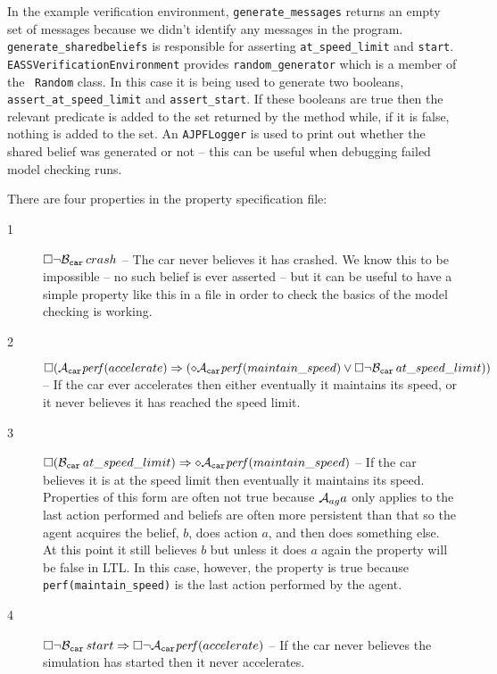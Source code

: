 \documentclass[a4]{article}
\begin{document}
In the example verification environment, \texttt{generate\_messages} returns an empty set of messages because we didn't identify any messages in the program.  \texttt{generate\_sharedbeliefs} is responsible for asserting \lstinline{at_speed_limit} and \lstinline{start}.  \texttt{EASSVerificationEnvironment} provides \texttt{random\_generator} which is a member of the \java\ \texttt{Random} class.  In this case it is being used to generate two booleans, \texttt{assert\_at\_speed\_limit} and \texttt{assert\_start}.  If these booleans are true then the relevant predicate is added to the set returned by the method while, if it is false, nothing is added to the set.  An \texttt{AJPFLogger} is used to print out whether the shared belief was generated or not -- this can be useful when debugging failed model checking runs.

There are four properties in the property specification file:
\begin{description}
\item[1] $\Box \neg \mathrm{{\cal B}}_{\texttt{car}} \, crash$ -- The car never believes it has crashed.  We know this to be impossible -- no such belief is ever asserted -- but it can be useful to have a simple property like this in a file in order to check the basics of the model checking is working.
\item[2] $\Box ( \mathrm{{\cal A}}_{\texttt{car}} \mathit{perf}(accelerate) \Rightarrow (\diamond \mathrm{{\cal A}}_{\texttt{car}} \mathit{perf}(maintain\_speed) \lor \Box  \neg \mathrm{{\cal B}}_{\texttt{car}} \, at\_speed\_limit))$ -- If the car ever accelerates then either eventually it maintains its speed, or it never believes it has reached the speed limit.
\item[3] $\Box ( \mathrm{{\cal B}}_{\texttt{car}} \, at\_speed\_limit) \Rightarrow \diamond \mathrm{{\cal A}}_{\texttt{car}} \mathit{perf}(maintain\_speed)$ -- If the car believes it is at the speed limit then eventually it maintains its speed.  Properties of this form are often not true because $\mathrm{{\cal A}}_{ag} a$ only applies to the last action performed and beliefs are often more persistent than that so the agent acquires the belief, $b$, does action $a$, and then does something else.  At this point it still believes $b$ but unless it does $a$ again the property will be false in LTL.  In this case, however, the property is true because \lstinline{perf(maintain_speed)} is the last action performed by the agent.
\item[4] $\Box \neg \mathrm{{\cal B}}_{\texttt{car}} \, start \Rightarrow \Box \neg \mathrm{{\cal A}}_{\texttt{car}} \mathit{perf}(accelerate)$ -- If the car never believes the simulation has started then it never accelerates.
\end{description}  
\end{document}
